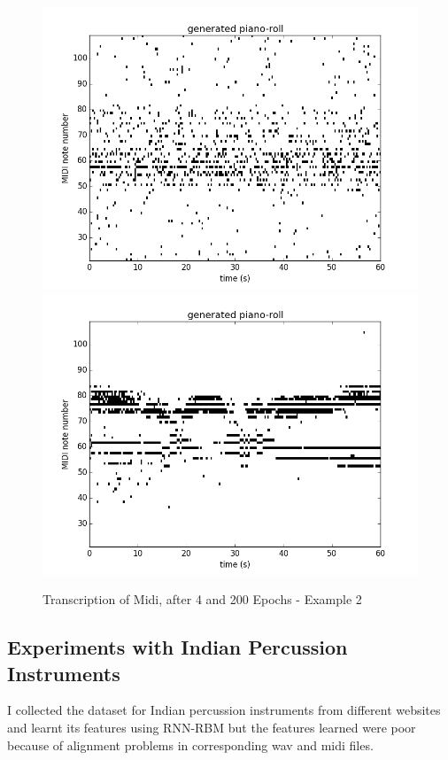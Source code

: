 \documentclass[letterpaper, 10 pt, conference]{ieeeconf}
\begin{document}
\begin{figure}[thpb]
      \centering
      \includegraphics[scale=0.35]{epoch_1_4.png}
      \includegraphics[scale=0.35]{epoch_200_4.png}
      \caption{Transcription of Midi, after 4 and 200 Epochs - Example 2}
      \label{fig:ex2}
\end{figure}

\subsection{Experiments with Indian Percussion Instruments}
I collected the dataset for Indian percussion instruments from different websites and learnt its features using RNN-RBM but the features learned were poor because of alignment problems in corresponding wav and midi files.
\end{document}
